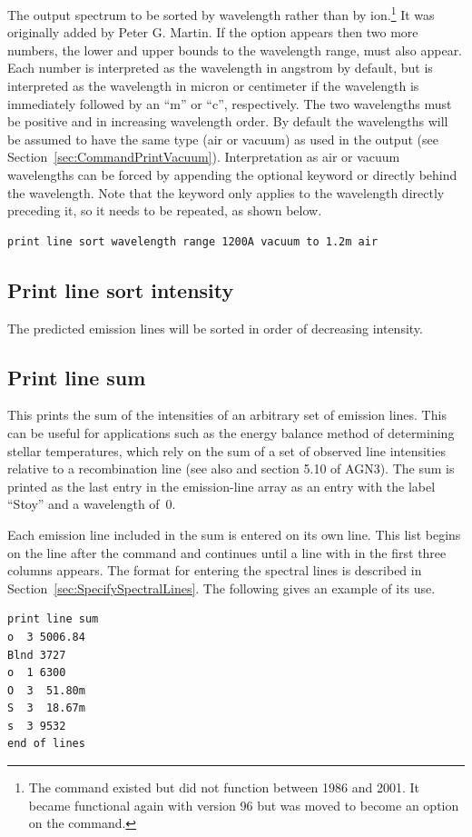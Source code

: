 The output spectrum to be sorted by wavelength rather than by
ion.\footnote{The  command existed but did not function between 1986
and 2001.  It became functional again with version 96 but was moved to become
an option on the  command.}
It was originally added by Peter G. Martin.
If the  option appears
then two more numbers, the lower and upper bounds to the wavelength range,
must also appear.
Each number is interpreted as the wavelength in angstrom
by default, but is interpreted as the wavelength in micron or centimeter
if the wavelength is immediately followed by an ``m'' or ``c'', respectively.
The two
wavelengths must be positive and in increasing wavelength order.
By default the wavelengths will be assumed to have the same type (air or
vacuum) as used in the output (see Section~\ref{sec:CommandPrintVacuum}).
Interpretation as air or vacuum wavelengths can be forced by appending the optional
keyword  or  directly behind the wavelength.
Note that the keyword only applies to the wavelength directly preceding it, so
it needs to be repeated, as shown below.
\begin{verbatim}
print line sort wavelength range 1200A vacuum to 1.2m air
\end{verbatim}

\subsection{Print line sort intensity}

The predicted emission lines will be sorted in order of decreasing
intensity.

\subsection{Print line sum}

This prints the sum of the intensities of an arbitrary set of emission
lines.
This can be useful for applications such as the \citet{Stoy1933} energy
balance method of determining stellar temperatures, which rely on the sum
of a set of observed line intensities relative to a recombination line (see also \citealp{Kaler1991} and section 5.10 of AGN3).
The sum is printed
as the last entry in the emission-line array as an entry with the label
``Stoy'' and a wavelength of~0.

Each emission line included in the sum is entered on its own line.  This
list begins on the line after the  command and continues until
a line with  in the first three columns appears.
The format for entering the spectral lines is described in Section~\ref{sec:SpecifySpectralLines}.
The following gives
an example of its use.
\begin{verbatim}
print line sum
o  3 5006.84
Blnd 3727
o  1 6300
O  3  51.80m
S  3  18.67m
s  3 9532
end of lines
\end{verbatim}

